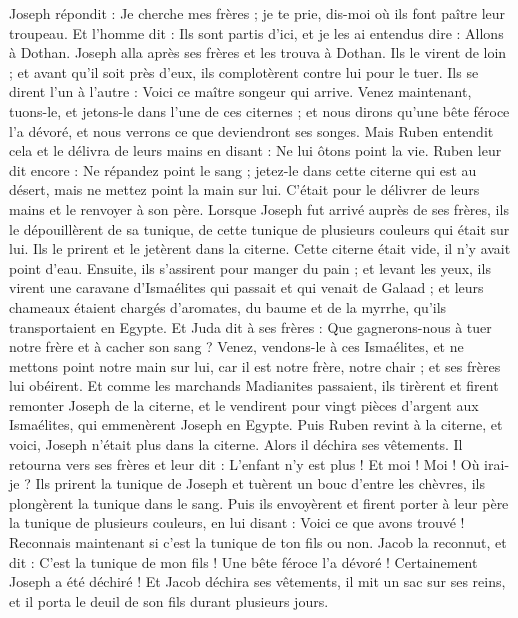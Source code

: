 \begin{multicols}{2}
Joseph répondit : Je cherche mes frères ; je te prie, dis-moi où ils font paître leur troupeau.
Et l'homme dit : Ils sont partis d'ici, et je les ai entendus dire : Allons à Dothan. Joseph alla après ses frères et les trouva à Dothan.
Ils le virent de loin ; et avant qu'il soit près d’eux, ils complotèrent contre lui pour le tuer.
Ils se dirent l'un à l'autre : Voici ce maître songeur qui arrive.
Venez maintenant, tuons-le, et jetons-le dans l’une de ces citernes ; et nous dirons qu'une bête féroce l'a dévoré, et nous verrons ce que deviendront ses songes.
Mais Ruben entendit cela et le délivra de leurs mains en disant : Ne lui ôtons point la vie.
Ruben leur dit encore : Ne répandez point le sang ; jetez-le dans cette citerne qui est au désert, mais ne mettez point la main sur lui. C'était pour le délivrer de leurs mains et le renvoyer à son père.
Lorsque Joseph fut arrivé auprès de ses frères, ils le dépouillèrent de sa tunique, de cette tunique de plusieurs couleurs qui était sur lui.
Ils le prirent et le jetèrent dans la citerne.  Cette citerne était vide, il n'y avait point d'eau.
Ensuite, ils s'assirent pour manger du pain ; et levant les yeux, ils virent une caravane d'Ismaélites qui passait et qui venait de Galaad ; et leurs chameaux étaient chargés d’aromates, du baume et de la myrrhe, qu’ils transportaient en Egypte.
Et Juda dit à ses frères : Que gagnerons-nous à tuer notre frère et à cacher son sang ?
Venez, vendons-le à ces Ismaélites, et ne mettons point notre main sur lui, car il est notre frère, notre chair ; et ses frères lui obéirent.
Et comme les marchands Madianites passaient, ils tirèrent et firent remonter Joseph de la citerne, et le vendirent pour vingt pièces d'argent aux Ismaélites, qui emmenèrent Joseph en Egypte.
Puis Ruben revint à la citerne, et voici, Joseph n'était plus dans la citerne. Alors il déchira ses vêtements.
Il retourna vers ses frères et leur dit : L'enfant n’y est plus ! Et moi ! Moi ! Où irai-je ?
Ils prirent la tunique de Joseph et tuèrent un bouc d'entre les chèvres, ils plongèrent la tunique dans le sang.
Puis ils envoyèrent et firent porter à leur père la tunique de plusieurs couleurs, en lui disant : Voici ce que avons trouvé ! Reconnais maintenant si c'est la tunique de ton fils ou non.
Jacob la reconnut, et dit : C'est la tunique de mon fils ! Une bête féroce l'a dévoré ! Certainement Joseph a été déchiré !
Et Jacob déchira ses vêtements, il mit un sac sur ses reins, et il porta le deuil de son fils durant plusieurs jours.

\end{multicols}
